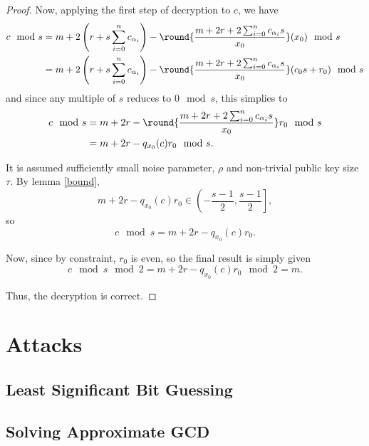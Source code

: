 \documentclass[a4paper,11pt, oneside]{article}
\begin{document}
\begin{proof}
Now, applying the first step of decryption to $c$, we have
    \begin{align*}
        c\mod{s} &= m + 2\left( r + s\sum_{i=0}^n c_{\alpha_i}\right) - \round{\frac{m + 2r + 2\sum_{i=0}^nc_{\alpha_i}s}{x_0}}(x_0)\mod{s}\\
                 &= m + 2\left( r + s\sum_{i=0}^n c_{\alpha_i}\right) - \round{\frac{m + 2r + 2\sum_{i=0}^nc_{\alpha_i}s}{x_0}}(c_0s+r_0)\mod{s}
    \end{align*}
    and since any multiple of $s$ reduces to $0\mod{s}$, this simplies to
    \begin{align*}
        c\mod{s} &= m + 2r - \round{\frac{m + 2r + 2\sum_{i=0}^nc_{\alpha_i}s}{x_0}}r_0\mod{s}\\
                 &= m + 2r - q_{x_0}(c)r_0\mod{s}.
    \end{align*}
    
    It is assumed sufficiently small noise parameter, $\rho$ and non-trivial public key size $\tau$.
    By lemma \ref{bound}, \[m+2r-q_{x_0}(c)r_0 \in \left(-\frac{s-1}{2}, \frac{s-1}{2}\right],\] 
    so 
    \[c\mod{s} = m + 2r - q_{x_0}(c)r_0.\]
    
    Now, since by constraint, $r_0$ is even, so the final result is simply given
    \[c\mod{s}\mod{2} = m + 2r - q_{x_0}(c)r_0\mod{2} = m. \]

    Thus, the decryption is correct.

\end{proof}



\section{Attacks}

\subsection{Least Significant Bit Guessing}
\subsection{Solving Approximate GCD}
\end{document}
